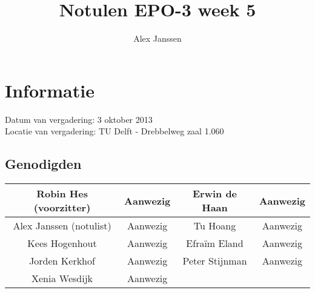 \documentclass{article}
\begin{document}
\title{Notulen EPO-3 week 5 }%
\author{Alex Janssen}%
\maketitle

\section*{Informatie}
Datum van vergadering: 3 oktober 2013\\  %
Locatie van vergadering: TU Delft - Drebbelweg zaal 1.060 %
\subsection*{Genodigden}
\begin{center}
\begin{tabular}{|c |c | c| c|}
	\hline
Robin Hes (voorzitter) & Aanwezig & Erwin de Haan & Aanwezig \\
	\hline
Alex Janssen (notulist) & Aanwezig & Tu Hoang & Aanwezig \\
	\hline
Kees Hogenhout & Aanwezig & Efraïm Eland & Aanwezig\\
	\hline
Jorden Kerkhof & Aanwezig & Peter Stijnman & Aanwezig \\
	\hline
Xenia Wesdijk & Aanwezig & & \\
	\hline
\end{tabular}
\end{center}
\end{document}
